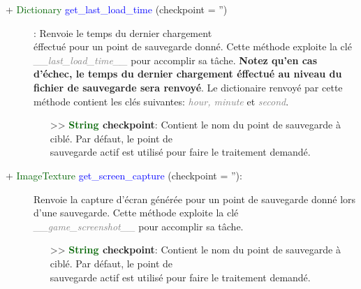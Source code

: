 \documentclass[a4paper, 11pt]{article}
\begin{document}
	\begin{description}
		\item [+ \textcolor{darkgreen}{Dictionary} \textcolor{blue}{get\_last\_load\_time} (checkpoint =
		'')]: Renvoie le temps du dernier chargement \\éffectué pour un point de sauvegarde donné. Cette
		méthode exploite la clé \textit{\textcolor {gray}{\_\_last\_load\_time\_\_}} pour accomplir sa
		tâche. \textbf{Notez qu'en cas d'échec, le temps du dernier chargement éffectué au niveau du fichier
		de sauvegarde sera renvoyé}. Le dictionaire renvoyé par cette méthode contient les clés suivantes:
		\textit{\textcolor{gray}{hour, minute}} et \textit{\textcolor{gray}{second}}.
		\begin{itemize}
			\item [>> \textbf{\textcolor{darkgreen}{String} checkpoint}:] Contient le nom du point de 
			sauvegarde à ciblé. Par défaut, le point de \\sauvegarde actif est utilisé pour faire le
			traitement demandé.\\
		\end{itemize}
	\end{description}
	\begin{description}
		\item [+ \textcolor{darkgreen}{ImageTexture} \textcolor{blue}{get\_screen\_capture} (checkpoint =
		''):] Renvoie la capture d'écran générée pour un point de sauvegarde donné lors d'une sauvegarde.
		Cette méthode exploite la clé \textit{\textcolor {gray}{\\\_\_game\_screenshot\_\_}} pour accomplir
		sa tâche.
		\begin{itemize}
			\item [>> \textbf{\textcolor{darkgreen}{String} checkpoint}:] Contient le nom du point de 
			sauvegarde à ciblé. Par défaut, le point de \\sauvegarde actif est utilisé pour faire le
			traitement demandé.\\
		\end{itemize}
	\end{description}
\end{document}
